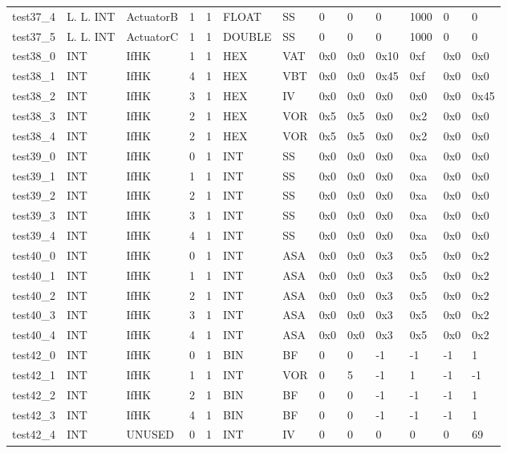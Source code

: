 \begin{longtable}{|l|l|l|p{0.5cm}|p{0.5cm}|l|p{0.5cm}|p{0.5cm}|p{0.5cm}|l|l|p{0.5cm}|l|}
test37\_4 & L. L. INT & ActuatorB & 1 & 1 & FLOAT & SS & 0 & 0 & 0 & 1000 & 0 & 0 \\
test37\_5 & L. L. INT & ActuatorC & 1 & 1 & DOUBLE & SS & 0 & 0 & 0 & 1000 & 0 & 0 \\
test38\_0 & INT & IfHK & 1 & 1 & HEX & VAT & 0x0 & 0x0 & 0x10 & 0xf & 0x0 & 0x0 \\
test38\_1 & INT & IfHK & 4 & 1 & HEX & VBT & 0x0 & 0x0 & 0x45 & 0xf & 0x0 & 0x0 \\
test38\_2 & INT & IfHK & 3 & 1 & HEX & IV & 0x0 & 0x0 & 0x0 & 0x0 & 0x0 & 0x45 \\
test38\_3 & INT & IfHK & 2 & 1 & HEX & VOR & 0x5 & 0x5 & 0x0 & 0x2 & 0x0 & 0x0 \\
test38\_4 & INT & IfHK & 2 & 1 & HEX & VOR & 0x5 & 0x5 & 0x0 & 0x2 & 0x0 & 0x0 \\
test39\_0 & INT & IfHK & 0 & 1 & INT & SS & 0x0 & 0x0 & 0x0 & 0xa & 0x0 & 0x0 \\
test39\_1 & INT & IfHK & 1 & 1 & INT & SS & 0x0 & 0x0 & 0x0 & 0xa & 0x0 & 0x0 \\
test39\_2 & INT & IfHK & 2 & 1 & INT & SS & 0x0 & 0x0 & 0x0 & 0xa & 0x0 & 0x0 \\
test39\_3 & INT & IfHK & 3 & 1 & INT & SS & 0x0 & 0x0 & 0x0 & 0xa & 0x0 & 0x0 \\
test39\_4 & INT & IfHK & 4 & 1 & INT & SS & 0x0 & 0x0 & 0x0 & 0xa & 0x0 & 0x0 \\
test40\_0 & INT & IfHK & 0 & 1 & INT & ASA & 0x0 & 0x0 & 0x3 & 0x5 & 0x0 & 0x2 \\
test40\_1 & INT & IfHK & 1 & 1 & INT & ASA & 0x0 & 0x0 & 0x3 & 0x5 & 0x0 & 0x2 \\
test40\_2 & INT & IfHK & 2 & 1 & INT & ASA & 0x0 & 0x0 & 0x3 & 0x5 & 0x0 & 0x2 \\
test40\_3 & INT & IfHK & 3 & 1 & INT & ASA & 0x0 & 0x0 & 0x3 & 0x5 & 0x0 & 0x2 \\
test40\_4 & INT & IfHK & 4 & 1 & INT & ASA & 0x0 & 0x0 & 0x3 & 0x5 & 0x0 & 0x2 \\
test42\_0 & INT & IfHK & 0 & 1 & BIN & BF & 0 & 0 & -1 & -1 & -1 & 1 \\
test42\_1 & INT & IfHK & 1 & 1 & INT & VOR & 0 & 5 & -1 & 1 & -1 & -1 \\
test42\_2 & INT & IfHK & 2 & 1 & BIN & BF & 0 & 0 & -1 & -1 & -1 & 1 \\
test42\_3 & INT & IfHK & 4 & 1 & BIN & BF & 0 & 0 & -1 & -1 & -1 & 1 \\
test42\_4 & INT & UNUSED & 0 & 1 & INT & IV & 0 & 0 & 0 & 0 & 0 & 69 \\

\end{longtable}
